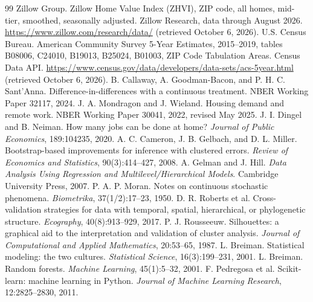 \documentclass[11pt]{article}
\begin{document}
\begin{thebibliography}{99}\setlength{\itemsep}{0pt}
 Zillow Group. Zillow Home Value Index (ZHVI), ZIP code, all homes, mid-tier, smoothed, seasonally adjusted. Zillow
Research, data through August 2026. \url{https://www.zillow.com/research/data/} (retrieved October 6, 2026).
 U.S. Census Bureau. American Community Survey 5-Year Estimates, 2015--2019, tables B08006, C24010, B19013, B25024,
B01003, ZIP Code Tabulation Areas. Census Data API. \url{https://www.census.gov/data/developers/data-sets/acs-5year.html}
(retrieved October 6, 2026).
 B. Callaway, A. Goodman-Bacon, and P. H. C. Sant'Anna. Difference-in-differences with a continuous treatment.
NBER Working Paper 32117, 2024.
 J. A. Mondragon and J. Wieland. Housing demand and remote work. NBER Working Paper 30041, 2022, revised May 2025.
 J. I. Dingel and B. Neiman. How many jobs can be done at home? \textit{Journal of Public Economics}, 189:104235, 2020.
 A. C. Cameron, J. B. Gelbach, and D. L. Miller. Bootstrap-based improvements for inference with clustered errors.
\textit{Review of Economics and Statistics}, 90(3):414--427, 2008.
 A. Gelman and J. Hill. \textit{Data Analysis Using Regression and Multilevel/Hierarchical Models}. Cambridge
University Press, 2007.
 P. A. P. Moran. Notes on continuous stochastic phenomena. \textit{Biometrika}, 37(1/2):17--23, 1950.
 D. R. Roberts et al. Cross-validation strategies for data with temporal, spatial, hierarchical, or phylogenetic
structure. \textit{Ecography}, 40(8):913--929, 2017.
 P. J. Rousseeuw. Silhouettes: a graphical aid to the interpretation and validation of cluster analysis.
\textit{Journal of Computational and Applied Mathematics}, 20:53--65, 1987.
 L. Breiman. Statistical modeling: the two cultures. \textit{Statistical Science}, 16(3):199--231, 2001.
 L. Breiman. Random forests. \textit{Machine Learning}, 45(1):5--32, 2001.
 F. Pedregosa et al. Scikit-learn: machine learning in Python. \textit{Journal of Machine Learning Research},
12:2825--2830, 2011.
\end{thebibliography}
\end{document}
